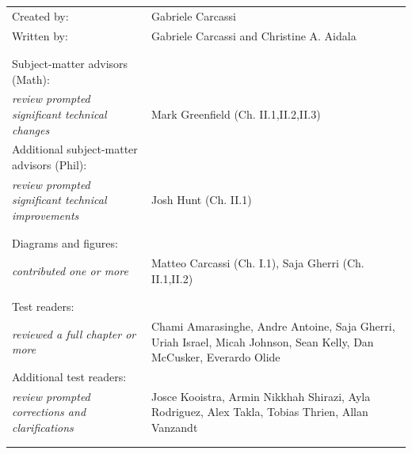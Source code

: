 \documentclass[11pt,letterpaper,fleqn]{memoir} %
\begin{document}
\begin{table}[h]
\centering
\begin{tabular}{>{\raggedleft}p{} >{\raggedright\arraybackslash}p{}}
Created by: & Gabriele Carcassi \\
Written by: & Gabriele Carcassi and Christine A. Aidala \\
& \\
& \\
Subject-matter advisors (Math): \\ \textit{\footnotesize review prompted significant technical changes} & Mark Greenfield (Ch. II.1,II.2,II.3) \\
Additional subject-matter advisors (Phil): \\ \textit{\footnotesize review prompted significant technical improvements} & Josh Hunt (Ch. II.1) \\
& \\
& \\
Diagrams and figures: \\ \textit{\footnotesize contributed one or more} & Matteo Carcassi (Ch. I.1), Saja Gherri (Ch. II.1,II.2) \\
& \\
& \\
Test readers: \\ \textit{\footnotesize reviewed a full chapter or more} & Chami Amarasinghe, Andre Antoine, Saja Gherri, Uriah Israel, Micah Johnson, Sean Kelly, Dan McCusker, Everardo Olide \\
Additional test readers: \\ \textit{\footnotesize review prompted corrections and clarifications} & Josce Kooistra, Armin Nikkhah Shirazi, Ayla Rodriguez, Alex Takla, Tobias Thrien, Allan Vanzandt \\
& \\
& \\





\end{tabular} 
\end{table}


	
\end{document}
